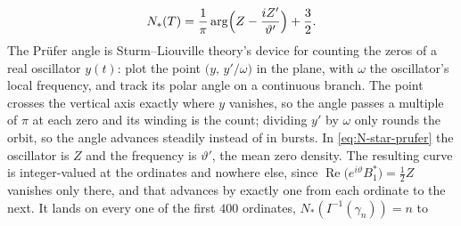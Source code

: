 \documentclass[11pt]{article}
\theoremstyle{definition}
\begin{document}
\begin{equation}\label{eq:N-star-prufer}
N_{\ast}(T)
=\frac{1}{\pi}\arg\Bigl(Z-\frac{iZ'}{\vartheta'}\Bigr)+\frac32.
\end{equation}
The Pr\"ufer angle is Sturm--Liouville theory's device for counting the zeros
of a real oscillator $y(t)$: plot the point $\bigl(y,\,y'/\omega\bigr)$ in the
plane, with $\omega$ the oscillator's local frequency, and track its polar
angle on a continuous branch. The point crosses the vertical axis exactly
where $y$ vanishes, so the angle passes a multiple of $\pi$ at each zero and
its winding is the count; dividing $y'$ by $\omega$ only rounds the orbit,
so the angle advances steadily instead of in bursts. In
\eqref{eq:N-star-prufer} the oscillator is $Z$ and the frequency is
$\vartheta'$, the mean zero density.
%
%
%
%
%
The resulting curve is integer-valued at the ordinates and nowhere else, since
$\operatorname{Re}\bigl(e^{i\vartheta}B_1^{\ast}\bigr)=\tfrac12Z$ vanishes only
there, and that advances by exactly one from each ordinate to the next. It lands
on every one of the first $400$ ordinates, $N_{\ast}(I^{-1}(\gamma_n))=n$ to
\end{document}
